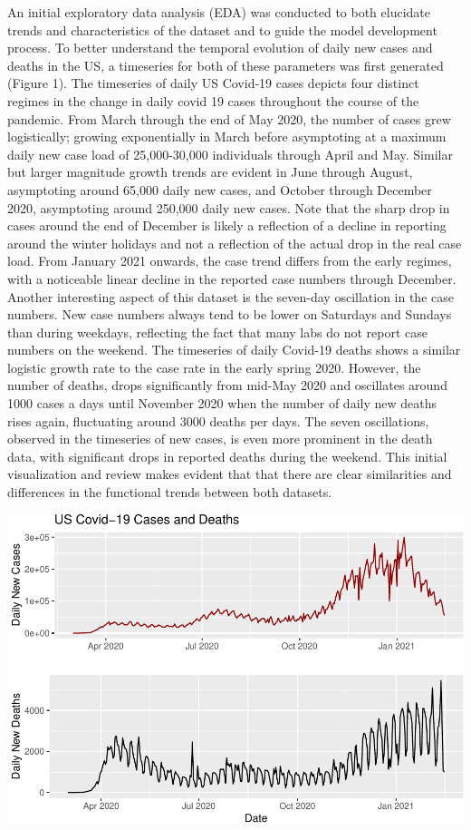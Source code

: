 \documentclass[11pt,]{article}
\begin{document}
An initial exploratory data analysis (EDA) was conducted to both
elucidate trends and characteristics of the dataset and to guide the
model development process. To better understand the temporal evolution
of daily new cases and deaths in the US, a timeseries for both of these
parameters was first generated (Figure 1). The timeseries of daily US
Covid-19 cases depicts four distinct regimes in the change in daily
covid 19 cases throughout the course of the pandemic. From March through
the end of May 2020, the number of cases grew logistically; growing
exponentially in March before asymptoting at a maximum daily new case
load of 25,000-30,000 individuals through April and May. Similar but
larger magnitude growth trends are evident in June through August,
asymptoting around 65,000 daily new cases, and October through December
2020, asymptoting around 250,000 daily new cases. Note that the sharp
drop in cases around the end of December is likely a reflection of a
decline in reporting around the winter holidays and not a reflection of
the actual drop in the real case load. From January 2021 onwards, the
case trend differs from the early regimes, with a noticeable linear
decline in the reported case numbers through December. Another
interesting aspect of this dataset is the seven-day oscillation in the
case numbers. New case numbers always tend to be lower on Saturdays and
Sundays than during weekdays, reflecting the fact that many labs do not
report case numbers on the weekend. The timeseries of daily Covid-19
deaths shows a similar logistic growth rate to the case rate in the
early spring 2020. However, the number of deaths, drops significantly
from mid-May 2020 and oscillates around 1000 cases a days until November
2020 when the number of daily new deaths rises again, fluctuating around
3000 deaths per days. The seven oscillations, observed in the timeseries
of new cases, is even more prominent in the death data, with significant
drops in reported deaths during the weekend. This initial visualization
and review makes evident that that there are clear similarities and
differences in the functional trends between both datasets.

\includegraphics{figs/unnamed-chunk-2.pdf}
\end{document}
